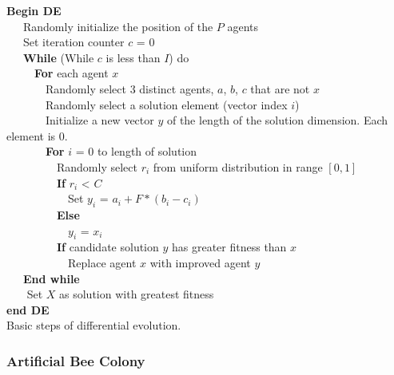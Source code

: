 \documentclass{tamuccthesis}
\begin{document}
\begin{algorithm}%
\textbf{Begin DE}\\
~~~Randomly initialize the position of the $P$ agents\\
~~~Set iteration counter $c$ = 0 \\
~~~\textbf{While} (While $c$ is less than $I$) do\\
~~~~~\textbf{For} each agent $x$ \\
~~~~~~~Randomly select 3 distinct agents, $a$, $b$, $c$ that are not $x$ \\
~~~~~~~Randomly select a solution element (vector index $i$) \\
~~~~~~~Initialize a new vector $y$ of the length of the solution dimension. Each element is $0$. \\
~~~~~~~\textbf{For} $i$ = 0 to length of solution \\
~~~~~~~~~Randomly select $r_i$ from uniform distribution in range $[0, 1]$ \\
~~~~~~~~~\textbf{If} $r_i$ < $C$ \\
~~~~~~~~~~~Set $y_i$ = $a_i + F * (b_i - c_i)$ \\
~~~~~~~~~\textbf{Else} \\
~~~~~~~~~~~$y_i$ = $x_i$ \\
~~~~~~~~~\textbf{If} candidate solution $y$ has greater fitness than $x$ \\
~~~~~~~~~~~Replace agent $x$ with improved agent $y$ \\
~~~\textbf{End while} \\
~~~ Set $X$ as solution with greatest fitness \\
\textbf{end DE}\\
\caption[Basic steps of differential evolution.]{Basic steps of differential evolution.}
\label{DE}
\end{algorithm}

\subsubsection{Artificial Bee Colony}
\end{document}
